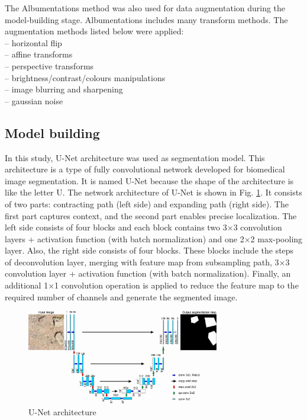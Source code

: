 \documentclass[a4paper,fleqn]{cas-sc}
\begin{document}
The Albumentations \citep{buslaev2020albumentations} method was also used for data augmentation during the model-building stage. Albumentations includes many transform methods. The augmentation methods listed below were applied:\\
– horizontal flip\\
– affine transforms\\
– perspective transforms\\
– brightness/contrast/colours manipulations\\
– image blurring and sharpening\\
– gaussian noise\\

\subsection{Model building}
In this study, U-Net architecture \citep{ronneberger2015u} was used as segmentation model. This architecture is a type of fully convolutional network developed for biomedical image segmentation. It is named U-Net because the shape of the architecture is like the letter U. The network architecture of U-Net is shown in Fig. \ref{fig:Figure5}. It consists of two parts: contracting path (left side) and expanding path (right side). The first part captures context, and the second part enables precise localization. The left side consists of four blocks and each block contains two 3$\times$3 convolution layers + activation function (with batch normalization) and one 2$\times$2 max-pooling layer. Also, the right side consists of four blocks. These blocks include the steps of deconvolution layer, merging with feature map from subsampling path, 3$\times$3 convolution layer + activation function (with batch normalization). Finally, an additional 1$\times$1 convolution operation is applied to reduce the feature map to the required number of channels and generate the segmented image.
\begin{figure}
	\centering
	\includegraphics[width=0.75\textwidth]{figures/fig5.jpg}
	\caption{U-Net architecture}
	\label{fig:Figure5}
\end{figure}
\end{document}
